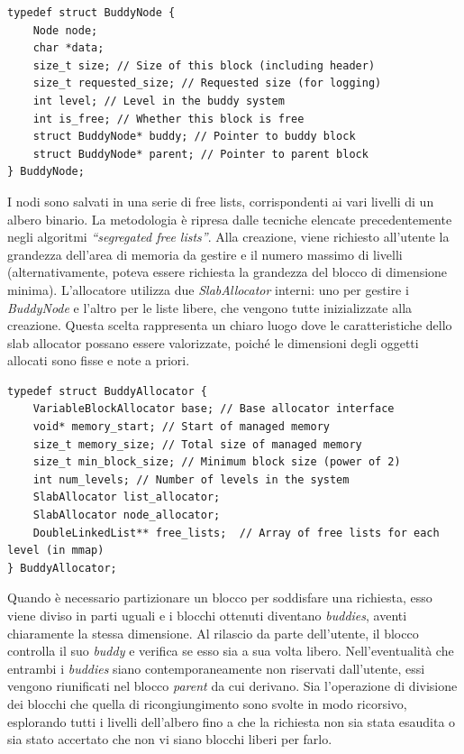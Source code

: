 \begin{lstlisting}
typedef struct BuddyNode {
    Node node;
    char *data;
    size_t size; // Size of this block (including header)
    size_t requested_size; // Requested size (for logging)
    int level; // Level in the buddy system
    int is_free; // Whether this block is free
    struct BuddyNode* buddy; // Pointer to buddy block
    struct BuddyNode* parent; // Pointer to parent block
} BuddyNode;
\end{lstlisting}

I nodi sono salvati in una serie di free lists, corrispondenti ai vari livelli di un albero binario. La metodologia è ripresa dalle tecniche elencate precedentemente negli algoritmi \textit{“segregated free lists”}. Alla creazione, viene richiesto all’utente la grandezza dell’area di memoria da gestire e il numero massimo di livelli (alternativamente, poteva essere richiesta la grandezza del blocco di dimensione minima). L'allocatore utilizza due \textit{SlabAllocator} interni: uno per gestire i \textit{BuddyNode} e l'altro per le liste libere, che vengono tutte inizializzate alla creazione. Questa scelta rappresenta un chiaro luogo dove le caratteristiche dello slab allocator possano essere valorizzate, poiché le dimensioni degli oggetti allocati sono fisse e note a priori.

\begin{lstlisting}
typedef struct BuddyAllocator {
    VariableBlockAllocator base; // Base allocator interface
    void* memory_start; // Start of managed memory
    size_t memory_size; // Total size of managed memory
    size_t min_block_size; // Minimum block size (power of 2)
    int num_levels; // Number of levels in the system
    SlabAllocator list_allocator;
    SlabAllocator node_allocator;
    DoubleLinkedList** free_lists;  // Array of free lists for each level (in mmap)
} BuddyAllocator;
\end{lstlisting}


Quando è necessario partizionare un blocco per soddisfare una richiesta, esso viene diviso in parti uguali e i blocchi ottenuti diventano \textit{buddies}, aventi chiaramente la stessa dimensione. Al rilascio da parte dell’utente, il blocco controlla il suo \textit{buddy} e verifica se esso sia a sua volta libero.
Nell’eventualità che entrambi i \textit{buddies} siano contemporaneamente non riservati dall’utente, essi vengono riunificati nel blocco \textit{parent} da cui derivano. Sia l'operazione di divisione dei blocchi che quella di ricongiungimento sono svolte in modo ricorsivo, esplorando tutti i livelli dell'albero fino a che la richiesta non sia stata esaudita o sia stato accertato che non vi siano blocchi liberi per farlo. 

